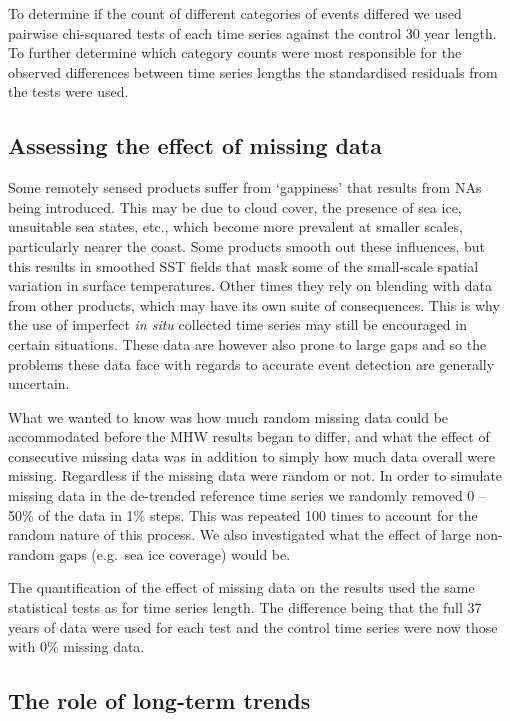 \documentclass[]{article}
\begin{document}
To determine if the count of different categories of events differed we
used pairwise chi-squared tests of each time series against the control
30 year length. To further determine which category counts were most
responsible for the observed differences between time series lengths the
standardised residuals from the tests were used.

\subsection{Assessing the effect of missing
data}\label{assessing-the-effect-of-missing-data}

Some remotely sensed products suffer from `gappiness' that results from
NAs being introduced. This may be due to cloud cover, the presence of
sea ice, unsuitable sea states, etc., which become more prevalent at
smaller scales, particularly nearer the coast. Some products smooth out
these influences, but this results in smoothed SST fields that mask some
of the small-scale spatial variation in surface temperatures. Other
times they rely on blending with data from other products, which may
have its own suite of consequences. This is why the use of imperfect
\emph{in situ} collected time series may still be encouraged in certain
situations. These data are however also prone to large gaps and so the
problems these data face with regards to accurate event detection are
generally uncertain.

What we wanted to know was how much random missing data could be
accommodated before the MHW results began to differ, and what the effect
of consecutive missing data was in addition to simply how much data
overall were missing. Regardless if the missing data were random or not.
In order to simulate missing data in the de-trended reference time
series we randomly removed 0 -- 50\% of the data in 1\% steps. This was
repeated 100 times to account for the random nature of this process. We
also investigated what the effect of large non-random gaps (e.g.~sea ice
coverage) would be.

The quantification of the effect of missing data on the results used the
same statistical tests as for time series length. The difference being
that the full 37 years of data were used for each test and the control
time series were now those with 0\% missing data.

\subsection{The role of long-term
trends}\label{the-role-of-long-term-trends}
\end{document}
